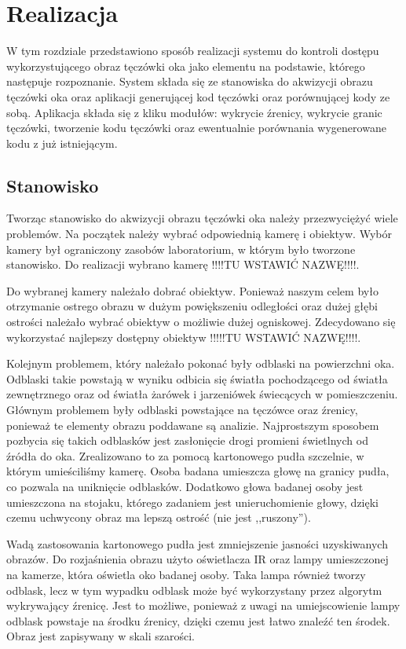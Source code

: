 \chapter{Realizacja}
\label{cha:realizacja}
W tym rozdziale przedstawiono sposób realizacji systemu do kontroli dostępu wykorzystującego obraz tęczówki oka jako elementu na podstawie, którego następuje rozpoznanie. System składa się ze stanowiska do akwizycji obrazu tęczówki oka oraz aplikacji generującej kod tęczówki oraz porównującej kody ze sobą. Aplikacja składa się z kliku modułów: wykrycie źrenicy, wykrycie granic tęczówki, tworzenie kodu tęczówki oraz ewentualnie porównania wygenerowane kodu z już istniejącym.

\section{Stanowisko}
\label{sec:stanowisko}
Tworząc stanowisko do akwizycji obrazu tęczówki oka należy przezwyciężyć wiele problemów. Na początek należy wybrać odpowiednią kamerę i obiektyw. Wybór kamery był ograniczony zasobów laboratorium, w którym było tworzone stanowisko. Do realizacji wybrano kamerę !!!!TU WSTAWIĆ NAZWĘ!!!!.

Do wybranej kamery należało dobrać obiektyw. Ponieważ naszym celem było otrzymanie ostrego obrazu w dużym powiększeniu odległości oraz dużej głębi ostrości należało wybrać obiektyw o możliwie dużej ogniskowej. Zdecydowano się wykorzystać najlepszy dostępny obiektyw !!!!!TU WSTAWIĆ NAZWĘ!!!!.

Kolejnym problemem, który należało pokonać były odblaski na powierzchni oka. Odblaski takie powstają w wyniku odbicia się światła pochodzącego od światła zewnętrznego oraz od światła żarówek i jarzeniówek świecących w pomieszczeniu. Głównym problemem były odblaski powstające na tęczówce oraz źrenicy, ponieważ te elementy obrazu poddawane są analizie. Najprostszym sposobem pozbycia się takich odblasków jest zasłonięcie drogi promieni świetlnych od źródła do oka. Zrealizowano to za pomocą kartonowego pudła szczelnie, w którym umieściliśmy kamerę. Osoba badana umieszcza głowę na granicy pudła, co pozwala na uniknięcie odblasków. Dodatkowo głowa badanej osoby jest umieszczona na stojaku, którego zadaniem jest unieruchomienie głowy, dzięki czemu uchwycony obraz ma lepszą ostrość (nie jest ,,ruszony'').

Wadą zastosowania kartonowego pudła jest zmniejszenie jasności uzyskiwanych obrazów. Do rozjaśnienia obrazu użyto oświetlacza IR oraz lampy umieszczonej na kamerze, która oświetla oko badanej osoby. Taka lampa również tworzy odblask, lecz w tym wypadku odblask może być wykorzystany przez algorytm wykrywający źrenicę. Jest to możliwe, ponieważ z uwagi na umiejscowienie lampy odblask powstaje na środku źrenicy, dzięki czemu jest łatwo znaleźć ten środek. Obraz jest zapisywany w skali szarości.


